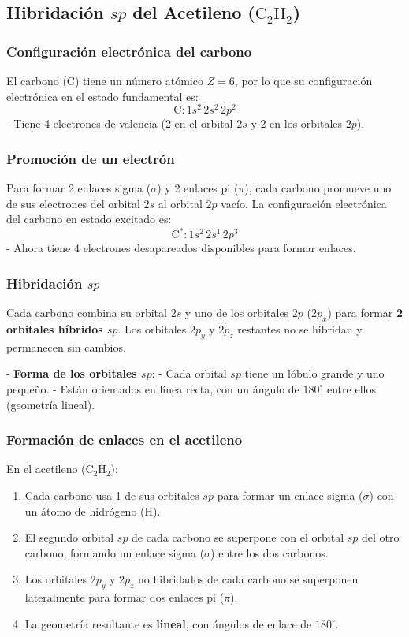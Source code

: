 \documentclass{article}
\begin{document}
\subsection{Hibridación \( sp \) del Acetileno (\( \text{C}_2\text{H}_2 \))}

\subsubsection{Configuración electrónica del carbono}
El carbono (C) tiene un número atómico \( Z = 6 \), por lo que su configuración electrónica en el estado fundamental es:
\[
\text{C}: 1s^2 \, 2s^2 \, 2p^2
\]
- Tiene 4 electrones de valencia (2 en el orbital \( 2s \) y 2 en los orbitales \( 2p \)).

\subsubsection{Promoción de un electrón}
Para formar 2 enlaces sigma (\( \sigma \)) y 2 enlaces pi (\( \pi \)), cada carbono promueve uno de sus electrones del orbital \( 2s \) al orbital \( 2p \) vacío. La configuración electrónica del carbono en estado excitado es:
\[
\text{C}^*: 1s^2 \, 2s^1 \, 2p^3
\]
- Ahora tiene 4 electrones desapareados disponibles para formar enlaces.

\subsubsection{Hibridación \( sp \)}
Cada carbono combina su orbital \( 2s \) y uno de los orbitales \( 2p \) (\( 2p_x \)) para formar \textbf{2 orbitales híbridos \( sp \)}. Los orbitales \( 2p_y \) y \( 2p_z \) restantes no se hibridan y permanecen sin cambios.

- \textbf{Forma de los orbitales \( sp \)}:
  - Cada orbital \( sp \) tiene un lóbulo grande y uno pequeño.
  - Están orientados en línea recta, con un ángulo de \( 180^\circ \) entre ellos (geometría lineal).

\subsubsection{Formación de enlaces en el acetileno}
En el acetileno (\( \text{C}_2\text{H}_2 \)):
\begin{enumerate}
    \item Cada carbono usa 1 de sus orbitales \( sp \) para formar un enlace sigma (\( \sigma \)) con un átomo de hidrógeno (H).
    \item El segundo orbital \( sp \) de cada carbono se superpone con el orbital \( sp \) del otro carbono, formando un enlace sigma (\( \sigma \)) entre los dos carbonos.
    \item Los orbitales \( 2p_y \) y \( 2p_z \) no hibridados de cada carbono se superponen lateralmente para formar dos enlaces pi (\( \pi \)).
    \item La geometría resultante es \textbf{lineal}, con ángulos de enlace de \( 180^\circ \).
\end{enumerate}
\end{document}
